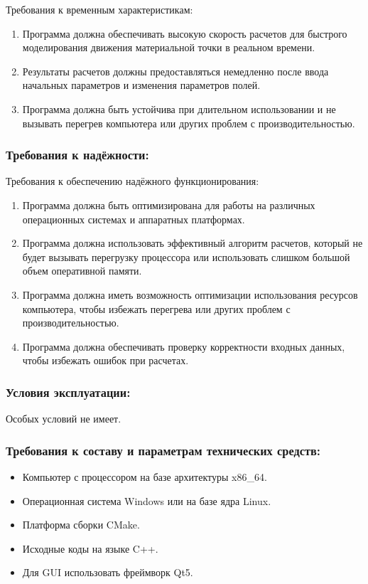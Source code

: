  Требования к временным характеристикам:

 \begin{enumerate}
  \item Программа должна обеспечивать высокую скорость расчетов для быстрого моделирования движения материальной точки в реальном времени.
  \item Результаты расчетов должны предоставляться немедленно после ввода начальных параметров и изменения параметров полей.
  \item Программа должна быть устойчива при длительном использовании и не вызывать перегрев компьютера или других проблем с производительностью.\newline
 \end{enumerate}

 \subsubsection*{Требования к надёжности:}
 Требования к обеспечению надёжного функционирования:
 \begin{enumerate}
  \item Программа должна быть оптимизирована для работы на различных операционных системах и аппаратных платформах.
  \item Программа должна использовать эффективный алгоритм расчетов, который не будет вызывать перегрузку процессора или использовать слишком большой объем оперативной памяти.
  \item Программа должна иметь возможность оптимизации использования ресурсов компьютера, чтобы избежать перегрева или других проблем с производительностью.
  \item Программа должна обеспечивать проверку корректности входных данных, чтобы избежать ошибок при расчетах.\newline
 \end{enumerate}

 \subsubsection*{Условия эксплуатации:} Особых условий не имеет.\newline
 \subsubsection*{Требования к составу и параметрам технических средств:}
 \begin{itemize}
  \item  Компьютер с процессором на базе архитектуры x86\_64.
  \item  Операционная система Windows или на базе ядра Linux.
  \item  Платформа сборки CMake.
  \item  Исходные коды на языке C++.
  \item  Для GUI использовать фреймворк Qt5.\newline
 \end{itemize}


